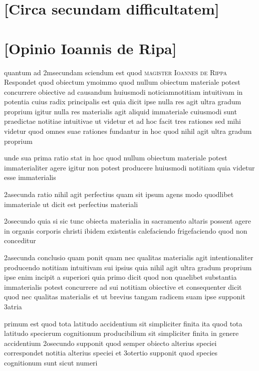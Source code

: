 \documentclass[twoside, openright]{report}
\newcommand{\name}[1]{\textsc{#1}}
\begin{document}
        \bigskip
         \section*{[Circa secundam difficultatem]} 
        \bigskip
         \section*{[Opinio Ioannis de Ripa]} 
        \pstart
        quantum ad 2msecundam sciendum est quod \name{magister Ioannes de Rippa} Respondet quod obiectum ymoimmo quod nullum obiectum materiale potest concurrere obiective ad causandum huiusmodi noticiamnotitiam intuitivam in potentia cuius radix principalis est quia dicit ipse nulla res agit ultra gradum proprium igitur nulla res materialis agit aliquid immateriale cuiusmodi sunt praedictae notitiae intuitivae ut videtur et ad hoc facit tres rationes sed mihi videtur quod omnes suae rationes fundantur in hoc quod nihil agit ultra gradum proprium
        \pend
     
        \pstart
        unde sua prima ratio stat in hoc quod nullum obiectum materiale potest immaterialiter agere igitur non potest producere huiusmodi notitiam quia videtur esse immaterialis
        \pend
     
        \pstart
        2asecunda ratio nihil agit perfectius quam sit ipsum agens modo quodlibet immateriale ut dicit est perfectius materiali
        \pend
     
        \pstart
        2osecundo quia si sic tunc obiecta materialia in sacramento altaris possent agere in organis corporis christi ibidem existentis calefaciendo frigefaciendo quod non conceditur
        \pend
     
        \pstart
        2asecunda conclusio quam ponit quam nec qualitas materialis agit intentionaliter producendo notitiam intuitivam sui ipsius quia nihil agit ultra gradum proprium ipse enim incipit a superiori quia primo  dicit quod non quaelibet substantia immaterialis potest concurrere ad sui notitiam obiective et consequenter dicit quod nec qualitas materialis et ut brevius tangam radicem suam ipse supponit 3atria
        \pend
     
        \pstart
        primum est quod tota latitudo accidentium sit simpliciter finita ita quod tota latitudo specierum cognitionum producibilium sit simpliciter finita in genere accidentium 2osecundo supponit quod semper obiecto alterius speciei correspondet notitia alterius speciei et 3otertio supponit quod species cognitionum sunt sicut numeri
        \pend
     
\end{document}
